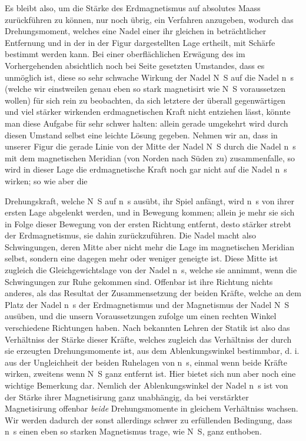 Es bleibt also, um die Stärke des Erdmagnetismus auf absolutes Maass zurückführen zu können, nur noch übrig, ein Verfahren anzugeben, wodurch das Drehungsmoment, welches eine Nadel einer ihr gleichen in beträchtlicher Entfernung und in der in der Figur dargestellten Lage ertheilt, mit Schärfe bestimmt werden kann. Bei einer oberflächlichen Erwägung des im Vorhergehenden absichtlich noch bei Seite gesetzten Umstandes, dass es unmöglich ist, diese so sehr schwache Wirkung der Nadel N~S auf die Nadel n~s (welche wir einstweilen genau eben so stark magnetisirt wie N~S voraussetzen wollen) für sich rein zu beobachten, da sich letztere der überall gegenwärtigen und viel stärker wirkenden erdmagnetischen Kraft nicht entziehen lässt, könnte man diese Aufgabe für sehr schwer halten: allein gerade umgekehrt wird durch diesen Umstand selbst eine leichte Lösung gegeben. Nehmen wir an, dass in unserer Figur die gerade Linie von der Mitte der Nadel N~S durch die Nadel n~s mit dem magnetischen Meridian (von Norden nach Süden zu) zusammenfalle, so wird in dieser Lage die erdmagnetische Kraft noch gar nicht auf die Nadel n~s wirken; so wie aber die
\par\clearpage
{}
\noindent Drehungskraft, welche N~S auf n~s ausübt, ihr Spiel anfängt, wird n~s von ihrer ersten Lage abgelenkt werden, und in Bewegung kommen; allein je mehr sie sich in Folge dieser Bewegung von der ersten Richtung entfernt, desto stärker strebt der Erdmagnetismus, sie dahin zurückzuführen. Die Nadel macht also Schwingungen, deren Mitte aber nicht mehr die Lage im magnetischen Meridian selbst, sondern eine dagegen mehr oder weniger geneigte ist. Diese Mitte ist zugleich die Gleichgewichtslage von der Nadel n~s, welche sie annimmt, wenn die Schwingungen zur Ruhe gekommen sind. Offenbar ist ihre Richtung nichts anderes, als das Resultat der Zusammensetzung der beiden Kräfte, welche an dem Platz der Nadel n~s der Erdmagnetismus und der Magnetismus der Nadel N~S ausüben, und die unsern Voraussetzungen zufolge um einen rechten Winkel verschiedene Richtungen haben. Nach bekannten Lehren der Statik ist also das Verhältniss der Stärke dieser Kräfte, welches zugleich das Verhältniss der durch sie erzeugten Drehungsmomente ist, aus dem Ablenkungswinkel bestimmbar, d. i. aus der Ungleichheit der beiden Ruhelagen von n~s, einmal wenn beide Kräfte wirken, zweitens wenn N~S ganz entfernt ist. Hier bietet sich nun aber noch eine wichtige Bemerkung dar. Nemlich der Ablenkungswinkel der Nadel n~s ist von der Stärke ihrer Magnetisirung ganz unabhängig, da bei verstärkter Magnetisirung offenbar \textit{beide} Drehungsmomente in gleichem Verhältniss wachsen. Wir werden dadurch der sonst allerdings schwer zu erfüllenden Bedingung, dass n~s einen eben so starken Magnetismus trage, wie N~S, ganz enthoben.

